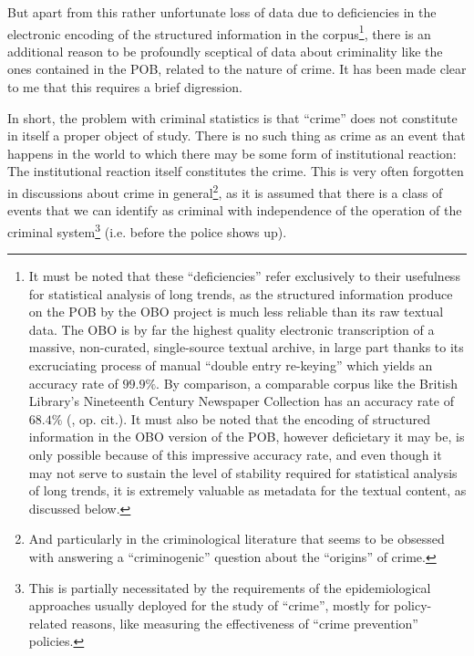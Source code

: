 But apart from this rather unfortunate loss of data due to deficiencies in the electronic encoding of the structured information in the corpus\footnote{
    \label{foot:deficiencies}
    It must be noted that these ``deficiencies'' refer exclusively to their usefulness for statistical analysis of long trends, as the structured information produce on the POB by the OBO project is much less reliable than its raw textual data.
    The OBO is by far the highest quality electronic transcription of a massive, non-curated, single-source textual archive, in large part thanks to its excruciating process of manual ``double entry re-keying'' which yields an accuracy rate of $99.9\%$.
    By comparison, a comparable corpus like the British Library's Nineteenth Century Newspaper Collection has an accuracy rate of $68.4\%$ (\citeauthor{hitchcock2016}, op. cit.).
    It must also be noted that the encoding of structured information in the OBO version of the POB, however deficietary it may be, is only possible because of this impressive accuracy rate, and even though it may not serve to sustain the level of stability required for statistical analysis of long trends, it is extremely valuable as metadata for the textual content, as discussed below.
}, there is an additional reason to be profoundly sceptical of data about criminality like the ones contained in the POB, related to the nature of crime.
It has been made clear to me that this requires a brief digression.

In short, the problem with criminal statistics is that ``crime'' does not constitute in itself a proper object of study.
There is no such thing as crime as an event that happens in the world to which there may be some form of institutional reaction:
The institutional reaction itself constitutes the crime.
This is very often forgotten in discussions about crime in general\footnote{
    \label{foot:criminilogy1}
    And particularly in the criminological literature that seems to be obsessed with answering a ``criminogenic'' question
    about the ``origins'' of crime.
}, as it is assumed that there is a class of events that we
can identify as criminal with independence of the operation of the criminal system\footnote{
    \label{foot:criminology2}
    This is partially necessitated by the requirements of the epidemiological approaches usually deployed for the study of ``crime'', mostly for policy-related reasons, like measuring the effectiveness of ``crime prevention'' policies.
} (i.e. before the police shows up).

